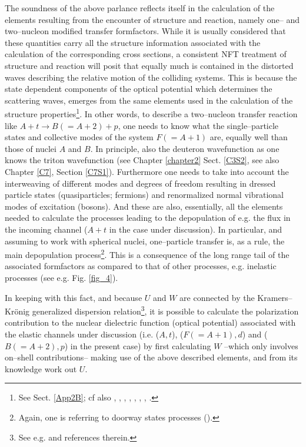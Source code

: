 The soundness of the above parlance  reflects itself in the calculation of the elements resulting from the encounter of structure and reaction, namely one-- and two--nucleon modified transfer formfactors. While it is usually considered that these quantities carry all the structure information associated with the calculation of the corresponding cross sections, a consistent NFT treatment of structure and reaction will posit that equally much is contained in the distorted waves describing the relative motion of the colliding systems. This is because the state dependent components of the optical potential  which determines the scattering waves, emerges from the same elements used in the calculation of the structure properties\footnote{See Sect. \ref{App2B}; cf also \cite{Broglia:81b}, \cite{Pollarolo:83}, \cite{Broglia:04a}, \cite{Fernandez:10}, \cite{Fernandez:10b}, \cite{Dickhoff:05}, \cite{Jenning:11}, \cite{Montanari:14} \cite{Barbieri:05,Dickhoff:17,Rotureau:17}.}. In other words, to describe a two--nucleon transfer reaction like $A+t\rightarrow B(=A+2)+p$, one needs to know what the single--particle states and collective modes of the system $F(=A+1)$ are, equally well than those of nuclei $A$ and $B$. In principle, also  the deuteron wavefunction as one knows the triton wavefunction (see Chapter \ref{chapter2} Sect. \ref{C3S2}, see also Chapter \ref{C7}, Section \ref{C7S1}). Furthermore one needs to take into account the interweaving of different modes and degrees of freedom resulting in   dressed particle states (quasiparticles; fermions) and renormalized normal vibrational modes of excitation (bosons). And these are also, essentially, all the elements needed to calculate the processes leading to the depopulation of e.g. the flux in the incoming channel ($A+t$ in the case under discussion). In particular, and assuming to work with spherical nuclei, one--particle transfer is, as a rule, the main depopulation process\footnote{Again, one is referring to doorway states processes (\cite{Feshbach:58}).}. This is a consequence of the long range tail of the associated formfactors as compared to that of other processes, e.g. inelastic processes (see e.g. Fig. \ref{fig_4}).


In keeping with this fact, and because $U$ and $W$ are connected by the Kramers--Kr\"onig generalized dispersion relation\footnote{See e.g. \cite{Mahaux:85} and references therein.}, it is possible to calculate the polarization contribution to the nuclear dielectric function (optical potential) associated with the elastic channels under discussion (i.e. ($A,t$), ($F(=A+1),d$) and ($B(=A+2),p$) in the present case) by first calculating  $W$ --which only involves on--shell contributions-- making use of the above described elements, and from its knowledge work out $U$.


